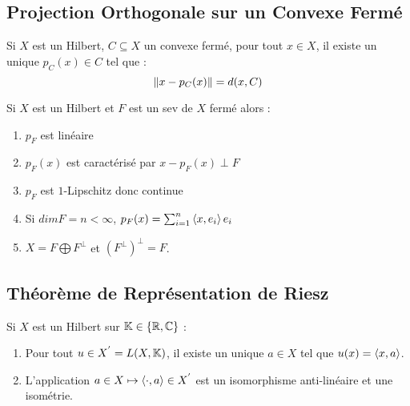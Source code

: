 \documentclass{cours}
\begin{document}
\subsection{Projection Orthogonale sur un Convexe Fermé}
\begin{theorem}
    Si $X$ est un Hilbert, $C \subseteq X$ un convexe fermé, pour tout $x \in X$, il existe un unique $p_{C}(x) \in C$ tel que :
    \[
        \left\lVert x - p_{C}(x) \right\rVert = d(x, C)
    \]
\end{theorem}
\begin{corollary}
    Si $X$ est un Hilbert et $F$ est un sev de $X$ fermé alors :
    \begin{enumerate}
        \item $p_{F}$ est linéaire
        \item $p_{F}(x)$ est caractérisé par $x - p_{F}(x) \perp F$
        \item $p_{F}$ est $1$-Lipschitz donc continue
        \item Si $dim F = n < \infty$, $p_{F}(x) = \sum_{i = 1}^{n}\left\langle x, e_{i} \right\rangle e_{i}$
        \item $X = F \bigoplus F^{\perp}$ et $\left(F^{\perp}\right)^{\perp} = F$.
    \end{enumerate}
\end{corollary}

\subsection{Théorème de Représentation de Riesz}
\begin{theorem}
    Si $X$ est un Hilbert sur $\mathbb{K} \in \left\{\mathbb{R}, \mathbb{C}\right\}$ :
    \begin{enumerate}
        \item Pour tout $u \in X^{'} = L(X, \mathbb{K})$, il existe un unique $a\in X$ tel que $u(x) = \left\langle x, a \right\rangle$.
        \item L'application $a \in X \mapsto \left\langle \cdot, a \right\rangle \in X^{'}$ est un isomorphisme anti-linéaire et une isométrie.
    \end{enumerate}
\end{theorem}
\end{document}

